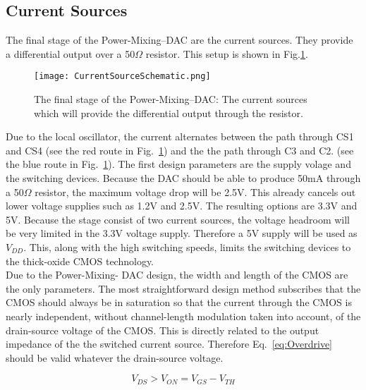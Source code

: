 
\subsection{Current Sources}\label{sec:currentsources}
The final stage of the Power-Mixing--DAC are the current sources. They provide a differential output over a 50$\Omega$ resistor. This setup is shown in Fig.\ref{figure:Current_sources}.
\begin{figure}[h!]
\begin{center}
\texttt{[image: CurrentSourceSchematic.png]}
\caption{The final stage of the Power-Mixing--DAC: The current sources which will provide the differential output through the resistor.}
\label{figure:Current_sources}
\end{center}
\end{figure}
Due to the local oscillator, the current alternates between the path through CS1 and CS4 (see the red route in Fig.~\ref{figure:Current_sources}) and the the path through C3 and C2. (see the blue route in Fig.~\ref{figure:Current_sources}). 
The first design parameters are the supply volage and the switching devices. Because the DAC should be able to produce 50mA through a 50$\Omega$ resistor, the maximum voltage drop will be 2.5V. This already cancels out lower voltage supplies such as 1.2V and 2.5V. The resulting options are 3.3V and 5V. Because the stage consist of two current sources, the voltage headroom will be very limited in the 3.3V voltage supply. Therefore a 5V supply will be used as $V_{DD}$. This, along with the high switching speeds, limits the switching devices to the thick-oxide CMOS technology.\\
Due to the Power-Mixing- DAC design, the width and length of the CMOS are the only parameters. The most straightforward design method subscribes that the CMOS should always be in saturation so that the current through the CMOS is nearly independent, without channel-length modulation taken into account, of the drain-source voltage of the CMOS. This is directly related to the output impedance of the the switched current source. Therefore Eq.~\ref{eq:Overdrive} should be valid whatever the drain-source voltage.

\begin{equation}\label{eq:Overdrive}{V_{DS} > V_{ON} = V_{GS} - V_{TH}}\end{equation}

